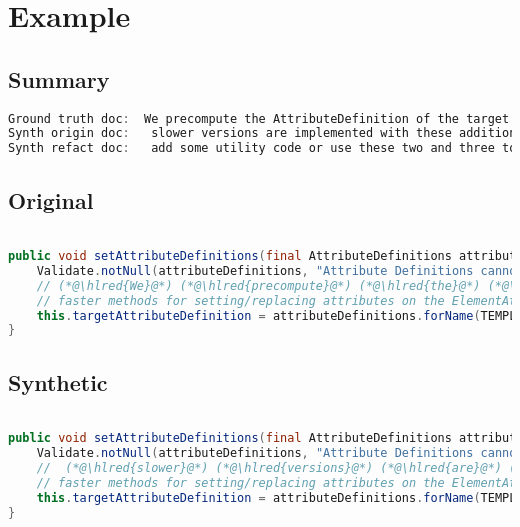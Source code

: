 \documentclass[11pt]{article}
\DeclareRobustCommand{\hlred}[1]{{\sethlcolor{YellowOrange}\hl{#1}}}
\begin{document}
  \pagebreak
  \section{Example}
  \subsection{Summary}

  \begin{lstlisting}[language=java]
Ground truth doc:  We precompute the AttributeDefinition of the target attribute in order to being able to use much
Synth origin doc:   slower versions are implemented with these additional methods which call additional methods for avoiding duplicate values
Synth refact doc:   add some utility code or use these two and three to use generic types to allow
  \end{lstlisting}

  \subsection{Original}
  \begin{lstlisting}[language=java]

public void setAttributeDefinitions(final AttributeDefinitions attributeDefinitions) {
    Validate.notNull(attributeDefinitions, "Attribute Definitions cannot be null");
    // (*@\hlred{We}@*) (*@\hlred{precompute}@*) (*@\hlred{the}@*) (*@\hlred{AttributeDefinition}@*) (*@\hlred{of}@*) (*@\hlred{the}@*) (*@\hlred{target}@*) (*@\hlred{attribute}@*) (*@\hlred{in}@*) (*@\hlred{order}@*) (*@\hlred{to}@*) (*@\hlred{being}@*) (*@\hlred{able}@*) (*@\hlred{to}@*) (*@\hlred{use}@*) (*@\hlred{much}@*)
    // faster methods for setting/replacing attributes on the ElementAttributes implementation
    this.targetAttributeDefinition = attributeDefinitions.forName(TEMPLATE_MODE, this.targetAttributeCompleteName);
}
  \end{lstlisting}
  \subsection{Synthetic}

  \begin{lstlisting}[language=java]

public void setAttributeDefinitions(final AttributeDefinitions attributeDefinitions) {
    Validate.notNull(attributeDefinitions, "Attribute Definitions cannot be null");
    //  (*@\hlred{slower}@*) (*@\hlred{versions}@*) (*@\hlred{are}@*) (*@\hlred{implemented}@*) (*@\hlred{with}@*) (*@\hlred{these}@*) (*@\hlred{additional}@*) (*@\hlred{methods}@*) (*@\hlred{which}@*) (*@\hlred{call}@*) (*@\hlred{additional}@*) (*@\hlred{methods}@*) (*@\hlred{for}@*) (*@\hlred{avoiding}@*) (*@\hlred{duplicate}@*) (*@\hlred{values}@*)
    // faster methods for setting/replacing attributes on the ElementAttributes implementation
    this.targetAttributeDefinition = attributeDefinitions.forName(TEMPLATE_MODE, this.targetAttributeCompleteName);
}
  \end{lstlisting}
\end{document}
